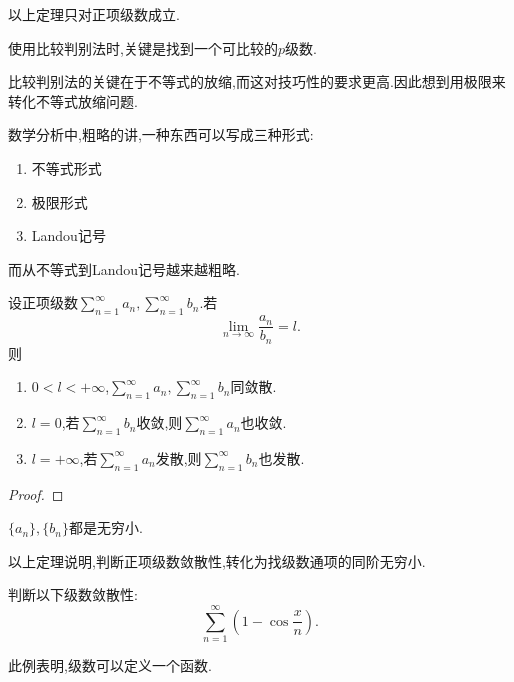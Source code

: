 \begin{remark}
    以上定理只对正项级数成立.
\end{remark}

使用比较判别法时,关键是找到一个可比较的$p$级数.

\begin{note}
    比较判别法的关键在于不等式的放缩,而这对技巧性的要求更高.因此想到用极限来转化不等式放缩问题.
\end{note}

\begin{note}
    数学分析中,粗略的讲,一种东西可以写成三种形式:
    \begin{enumerate}
        \item 不等式形式
        \item 极限形式
        \item Landou记号
    \end{enumerate}
    而从不等式到Landou记号越来越粗略.
\end{note}

\begin{theorem}[比较判别法的极限形式]
    设正项级数$\sum_{n=1}^\infty a_n,\sum_{n=1}^\infty b_n.$若
    \[\lim_{n\to\infty}\frac{a_n}{b_n}=l.\]
    则
    \begin{enumerate}
        \item $0<l<+\infty$,$\sum_{n=1}^\infty a_n,\sum_{n=1}^\infty b_n$同敛散.
        \item $l=0$,若$\sum_{n=1}^\infty b_n$收敛,则$\sum_{n=1}^\infty a_n$也收敛.
        \item $l=+\infty$,若$\sum_{n=1}^\infty a_n$发散,则$\sum_{n=1}^\infty b_n$也发散.
    \end{enumerate}
\end{theorem}

\begin{proof}%
    
\end{proof}

\begin{note}
    $\{a_n\},\{b_n\}$都是无穷小.
\end{note}

以上定理说明,判断正项级数敛散性,转化为找级数通项的同阶无穷小.

\begin{example}
    判断以下级数敛散性:
    \[\sum_{n=1}^\infty (1-\cos\frac{x}{n}).\]
\end{example}

\begin{remark}
    此例表明,级数可以定义一个函数.
\end{remark}

